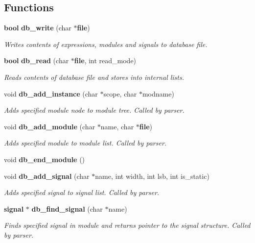 \subsection*{Functions}
\begin{CompactItemize}
\item 
{\bf bool} {\bf db\_\-write} (char $\ast${\bf file})
\begin{CompactList}\small\item\em Writes contents of expressions, modules and signals to database file.\item\end{CompactList}\item 
{\bf bool} {\bf db\_\-read} (char $\ast${\bf file}, int read\_\-mode)
\begin{CompactList}\small\item\em Reads contents of database file and stores into internal lists.\item\end{CompactList}\item 
void {\bf db\_\-add\_\-instance} (char $\ast$scope, char $\ast$modname)
\begin{CompactList}\small\item\em Adds specified module node to module tree. Called by parser.\item\end{CompactList}\item 
void {\bf db\_\-add\_\-module} (char $\ast$name, char $\ast${\bf file})
\begin{CompactList}\small\item\em Adds specified module to module list. Called by parser.\item\end{CompactList}\item 
void {\bf db\_\-end\_\-module} ()
\item 
void {\bf db\_\-add\_\-signal} (char $\ast$name, int width, int lsb, int is\_\-static)
\begin{CompactList}\small\item\em Adds specified signal to signal list. Called by parser.\item\end{CompactList}\item 
{\bf signal} $\ast$ {\bf db\_\-find\_\-signal} (char $\ast$name)
\begin{CompactList}\small\item\em Finds specified signal in module and returns pointer to the signal structure. Called by parser.\item\end{CompactList}\item 

\end{CompactItemize}
